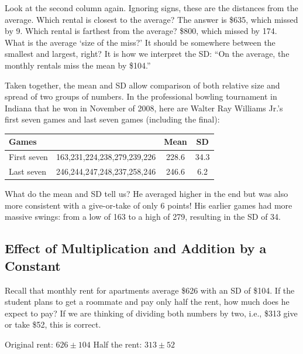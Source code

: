 \documentclass[11pt, chapterprefix=true]{scrbook}\usepackage[]{graphicx}\usepackage[]{color}
\begin{document}
Look at the second column again.  Ignoring signs, these are the distances from the average.  Which rental is closest to the average? The answer is \$635, which missed by 9. Which rental is farthest from the average?  \$800, which missed by 174.
What is the average `size of the miss?'  It should be somewhere between the smallest and largest, right?  It is how we interpret the SD: ``On the average, the monthly rentals miss the mean by \$104.''

Taken together, the mean and SD allow comparison of both relative size and spread of two groups of numbers.  In the professional bowling tournament in Indiana that he won in November of 2008, here are Walter Ray Williams Jr.'s first seven  games and last seven games (including the final):

\begin{table}[htbp]
   \centering
   \begin{tabular}{@{} | lccc | @{}} \hline
      Games &  & Mean & SD \\ \hline
      First seven & 163,231,224,238,279,239,226 & 228.6 & 34.3 \\
      Last seven  & 246,244,247,248,237,258,246 & 246.6 & 6.2 \\ \hline
   \end{tabular}
\end{table}

What do the mean and SD tell us?  He averaged higher in the end but was also more consistent with a give-or-take of only 6 points!  His earlier games had more massive swings: from a low of 163 to a high of 279, resulting in the SD of 34.

\subsection{Effect of Multiplication and Addition by a Constant}

Recall that monthly rent for apartments average \$626 with an SD of \$104.  If the student plans to get a roommate and pay only half the rent, how much does he expect to pay?  If we are thinking of dividing both numbers by two, i.e., \$313 give or take \$52, this is correct.

\begin{center}
Original rent: $ 626 \pm 104 $ \hspace{2cm}	Half the rent: $ 313 \pm 52 $
\end{center}
\end{document}
